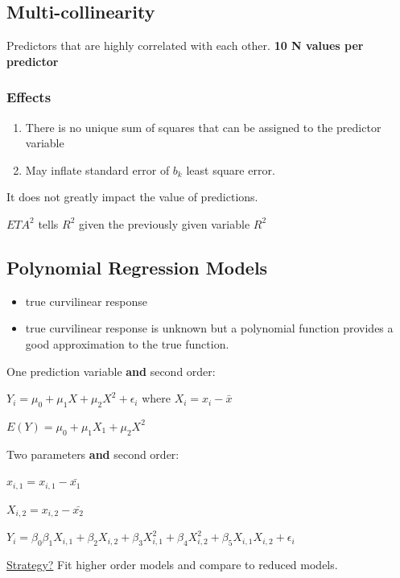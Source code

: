 \documentclass[11pt]{article}
\begin{document}
\subsection{Multi-collinearity}
\label{sec:org3ac75d7}

Predictors that are highly correlated with each other. \textbf{10 N values per predictor}

\subsubsection{Effects}
\label{sec:orge413264}
\begin{enumerate}
\item There is no unique sum of squares that can be assigned to the predictor
variable
\item May inflate standard error of \(b_k\) least square error.
\end{enumerate}

It does not greatly impact the value of predictions.

\({ETA}^2\) tells \(R^2\) given the previously given variable \(R^2\)
\subsection{Polynomial Regression Models}
\label{sec:org3338ef7}

\begin{itemize}
\item true curvilinear response
\item true curvilinear response is unknown but a polynomial function provides a good
approximation to the true function.
\end{itemize}


One prediction variable \textbf{and} second order:

\(Y_i = \mu_0 + \mu_1 X + \mu_2 X^2 + \epsilon_i\) where \(X_i = x_i - \bar{x}\)

\(E(Y) = \mu_0 + \mu_1 X_1 + \mu_2 X^2\)

Two parameters \textbf{and} second order:

\(x_{i,1} = x_{i,1} - \bar{x_1}\)

\(X_{i,2} = x_{i,2} - \bar{x_2}\)

\(Y_i = \beta_0 \beta_1 X_{i,1} + \beta_2 X_{i,2} + \beta_3 X_{i,1}^2 + \beta_4
X_{i,2}^2 + \beta_5 X_{i,1} X_{i,2} + \epsilon_i\)

\uline{Strategy?} Fit higher order models and compare to reduced models.
\end{document}

